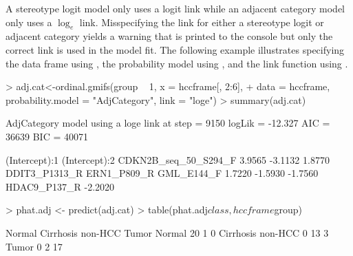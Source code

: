 \documentclass[article, shortclass, nojss]{jss}
\begin{document}
A stereotype logit model only uses a logit link while an adjacent category model only uses a $\log_e$ link. Misspecifying the link for either a stereotype logit or adjacent category yields a warning that is printed to the  console but only the correct link is used in the model fit. The following example illustrates specifying the data frame using , the probability model using , and the link function using .
\begin{Schunk}
\begin{Sinput}
> adj.cat<-ordinal.gmifs(group ~ 1, x = hccframe[, 2:6], 
+ 	data = hccframe, probability.model = "AdjCategory", link = "loge")
> summary(adj.cat)
\end{Sinput}
\begin{Soutput}
AdjCategory model using a loge link 
at step    =  9150 
logLik     =  -12.327 
AIC        =  36639 
BIC        =  40071 

       (Intercept):1        (Intercept):2 CDKN2B_seq_50_S294_F 
              3.9565              -3.1132               1.8770 
       DDIT3_P1313_R          ERN1_P809_R           GML_E144_F 
              1.7220              -1.5930              -1.7560 
        HDAC9_P137_R 
             -2.2020 
\end{Soutput}
\begin{Sinput}
> phat.adj <- predict(adj.cat)
> table(phat.adj$class, hccframe$group)
\end{Sinput}
\begin{Soutput}
                    Normal Cirrhosis non-HCC Tumor
  Normal                20                 1     0
  Cirrhosis non-HCC      0                13     3
  Tumor                  0                 2    17
\end{Soutput}
\end{Schunk}
\end{document}
